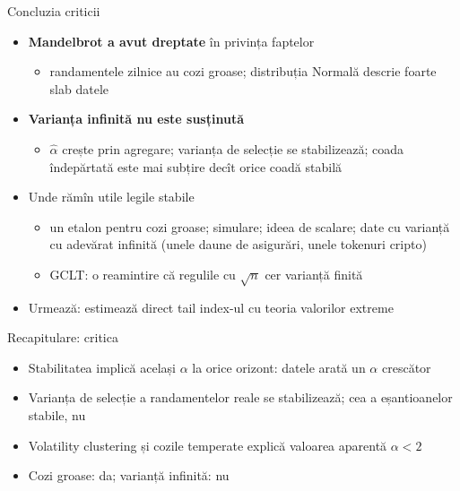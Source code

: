 \begin{frame}{Concluzia criticii}
\itemsize{\small}
\begin{itemize}
    \item \textbf{Mandelbrot a avut dreptate} în privința faptelor
    \begin{itemize}
        \item randamentele zilnice au cozi groase; distribuția Normală descrie foarte slab datele
    \end{itemize}
    \item \textbf{Varianța infinită nu este susținută}
    \begin{itemize}
        \item $\hat\alpha$ crește prin agregare; varianța de selecție se stabilizează; coada îndepărtată este mai subțire decît orice coadă stabilă
    \end{itemize}
    \item Unde rămîn utile legile stabile
    \begin{itemize}
        \item un etalon pentru cozi groase; simulare; ideea de scalare; date cu varianță cu adevărat infinită (unele daune de asigurări, unele tokenuri cripto)
        \item GCLT: o reamintire că regulile cu $\sqrt{n}$ cer varianță finită
    \end{itemize}
    \item Urmează:  estimează direct tail index-ul cu teoria valorilor extreme
\end{itemize}
\end{frame}

\begin{frame}{Recapitulare: critica}
\itemsize{\small}
\begin{itemize}
    \item Stabilitatea implică același $\alpha$ la orice orizont: datele arată un $\alpha$ crescător
    \item Varianța de selecție a randamentelor reale se stabilizează; cea a eșantioanelor stabile, nu
    \item Volatility clustering și cozile temperate explică valoarea aparentă $\alpha < 2$
    \item Cozi groase: da; varianță infinită: nu
\end{itemize}
\end{frame}



